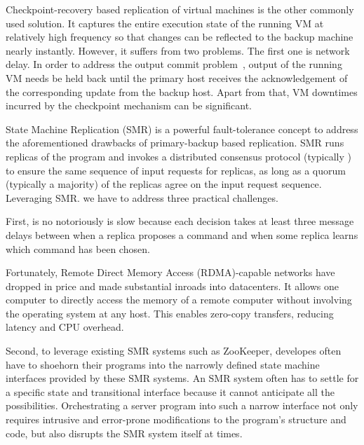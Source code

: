 Checkpoint-recovery based replication of virtual machines is the other commonly used solution. 
It captures the entire execution state of the running VM at relatively high frequency so that 
changes can be reflected to the backup machine nearly instantly. However, it suffers from two 
problems. The first one is network delay. In order to address the output commit 
problem~\cite{strom1987volatile}, output of the running VM needs be held back until the primary 
host receives the acknowledgement of the corresponding update from the backup host. Apart from 
that, VM downtimes incurred by the checkpoint mechanism can be significant.

State Machine Replication (SMR) is a powerful fault-tolerance concept to address the aforementioned 
drawbacks of primary-backup based replication. SMR runs replicas of the program and invokes a 
distributed consensus protocol (typically \paxos) to ensure the same sequence of input requests 
for replicas, as long as a quorum (typically a majority) of the replicas agree on the input 
request sequence. Leveraging SMR. we have to address three practical challenges. 

First, \paxos is no notoriously is slow because each decision takes at least three message delays 
between when a replica proposes a command and when some replica learns which command has been chosen.

Fortunately, Remote Direct Memory Access (RDMA)-capable networks have dropped in price and made 
substantial inroads into datacenters. It allows one computer to directly access the memory of 
a remote computer without involving the operating system at any host. This enables zero-copy 
transfers, reducing latency and CPU overhead.

Second, to leverage existing SMR systems such as ZooKeeper, developes often have to shoehorn their 
programs into the narrowly defined state machine interfaces provided by these SMR systems. An SMR 
system often has to settle for a specific state and transitional interface because it cannot 
anticipate all the possibilities. Orchestrating a server program into such a narrow interface not 
only requires intrusive and error-prone modifications to the program's structure and code, but also 
disrupts the SMR system itself at times.

